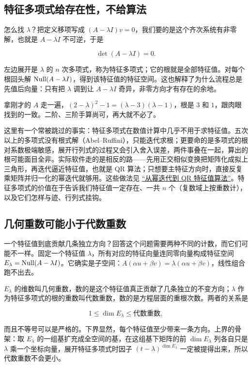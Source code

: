 \subsection{特征多项式给存在性，不给算法}

怎么找 \(\lambda\)？把定义移项写成 \((A-\lambda I)v=0\)，我们要的是这个齐次系统有非零解，也就是 \(A-\lambda I\) 不可逆，于是

\[
\det(A-\lambda I)=0 .
\]

左边展开是 \(\lambda\) 的 \(n\) 次多项式，称为特征多项式；它的根就是全部特征值。对每个根回头解 \(\operatorname{Null}(A-\lambda I)\)，得到该特征值的特征空间。这也解释了为什么流程总是先值后向量：只有把 \(\lambda\) 调到让 \(A-\lambda I\) 奇异，非零方向才有存在的余地。

拿刚才的 \(A\) 走一遍，\((2-\lambda)^2-1=(\lambda-3)(\lambda-1)\)，根是 \(3\) 和 \(1\)，跟肉眼找到的一致。二阶、三阶手算尚可，再大就不必了。

这里有一个常被跳过的事实：特征多项式在数值计算中几乎不用于求特征值。五次以上的多项式没有根式解（Abel--Ruffini），只能迭代求根；更要命的是多项式的根对系数极端敏感，展开行列式的过程又会引入舍入误差，两件事叠在一起，算出的根可能面目全非。实际软件走的是相反的路——先用正交相似变换把矩阵化成拟上三角形，再迭代逼近特征值，也就是 QR 算法；只想要主特征方向时，直接反复乘矩阵并归一化的幂迭代就够用。这些做法见 \hyperref[sec:08-Numerical-Analysis/05-Numerical-Linear-Algebra/05]{``从幂迭代到 QR 特征值算法''}。特征多项式的价值在于告诉我们特征值一定存在、一共 \(n\) 个（复数域上按重数计），以及它们怎样与迹、行列式挂钩。

\subsection{几何重数可能小于代数重数}

一个特征值到底贡献几条独立方向？回答这个问题需要两种不同的计数，而它们可能不一样。固定一个特征值 \(\lambda\)，所有对应的特征向量连同零向量构成特征空间 \(E_\lambda=\operatorname{Null}(A-\lambda I)\)。它确实是子空间：\(A(\alpha u+\beta v)=\lambda(\alpha u+\beta v)\)，线性组合跑不出去。

\(E_\lambda\) 的维数叫几何重数，数的是这个特征值真正贡献了几条独立的不变方向；\(\lambda\) 作为特征多项式的根的重数叫代数重数，数的是方程层面的重根次数。两者的关系是

\[
1\le \dim E_\lambda \le \text{代数重数},
\]

而且不等号可以是严格的。下界显然，每个特征值至少带来一条方向。上界的骨架：取 \(E_\lambda\) 的一组基扩充成全空间的基，在这组基下矩阵的前 \(\dim E_\lambda\) 列各自只是 \(\lambda\) 乘一个坐标向量，展开特征多项式时因子 \((t-\lambda)^{\dim E_\lambda}\) 一定被提得出来，所以代数重数不会更小。

